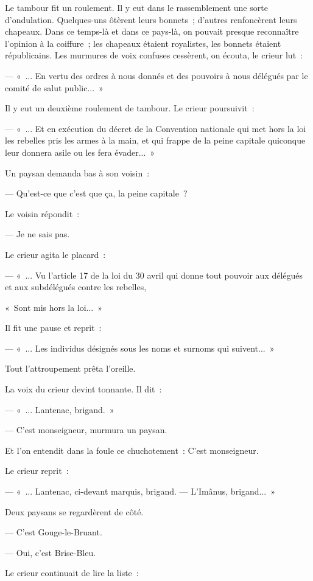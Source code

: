 \documentclass[french,twoside]{book} %
\begin{document}
Le tambour fit un roulement. Il y eut dans le rassemblement une sorte d’ondulation. Quelques-uns ôtèrent leurs bonnets ; d’autres renfoncèrent leurs chapeaux. Dans ce temps-là et dans ce pays-là, on pouvait presque reconnaître l’opinion à la coiffure ; les chapeaux étaient royalistes, les bonnets étaient républicains. Les murmures de voix confuses cessèrent, on écouta, le crieur lut :\par
— « ... En vertu des ordres à nous donnés et des pouvoirs à nous délégués par le comité de salut public... »\par
 Il y eut un deuxième roulement de tambour. Le crieur poursuivit :\par
— « ... Et en exécution du décret de la Convention nationale qui met hors la loi les rebelles pris les armes à la main, et qui frappe de la peine capitale quiconque leur donnera asile ou les fera évader... »\par
Un paysan demanda bas à son voisin :\par
— Qu’est-ce que c’est que ça, la peine capitale ?\par
Le voisin répondit :\par
— Je ne sais pas.\par
Le crieur agita le placard :\par
— « ... Vu l’article 17 de la loi du 30 avril qui donne tout pouvoir aux délégués et aux subdélégués contre les rebelles,\par
« Sont mis hors la loi... »\par
Il fit une pause et reprit :\par
— « ... Les individus désignés sous les noms et surnoms qui suivent... »\par
Tout l’attroupement prêta l’oreille.\par
La voix du crieur devint tonnante. Il dit :\par
— « ... Lantenac, brigand. »\par
— C’est monseigneur, murmura un paysan.\par
Et l’on entendit dans la foule ce chuchotement : C’est monseigneur.\par
Le crieur reprit :\par
— « ... Lantenac, ci-devant marquis, brigand. — L’Imânus, brigand... »\par
Deux paysans se regardèrent de côté.\par
— C’est Gouge-le-Bruant.\par
— Oui, c’est Brise-Bleu.\par
 Le crieur continuait de lire la liste :\par
\end{document}

